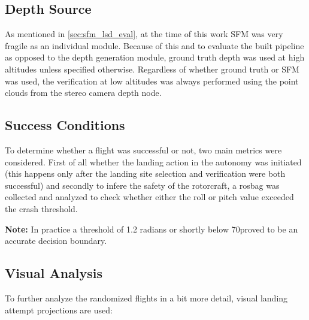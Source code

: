\subsection{Depth Source}
As mentioned in \cref{sec:sfm_lsd_eval}, at the time of this work SFM was very fragile as an individual module. Because of this and to evaluate the built pipeline as opposed to the depth generation module, ground truth depth was used at high altitudes unless specified otherwise. Regardless of whether ground truth or SFM was used, the verification at low altitudes was always performed using the point clouds from the stereo camera depth node.

\subsection{Success Conditions}
To determine whether a flight was successful or not, two main metrics were considered. First of all whether the landing action in the autonomy was initiated (this happens only after the landing site selection and verification were both successful) and secondly to infere the safety of the rotorcraft, a rosbag was collected and analyzed to check whether either the roll or pitch value exceeded the crash threshold.

\textbf{Note: } In practice a threshold of 1.2 radians or shortly below 70\degree proved to be an accurate decision boundary.

\subsection{Visual Analysis}
To further analyze the randomized flights in a bit more detail, visual landing attempt projections are used:


